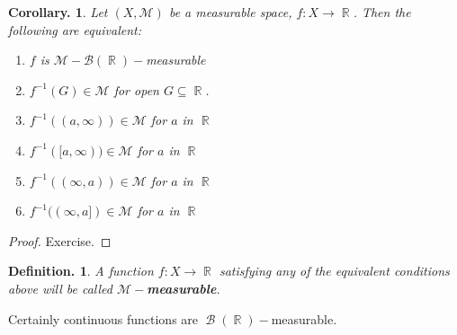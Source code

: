 \documentclass[11pt, a4paper]{memoir}
\DeclareMathOperator{\R}{{\mathbb{R}}}
\newcommand{\mbf}[1]{{\boldmath\bfseries #1}}
\theoremstyle{change}
\newtheorem{corollary}[theorem]{Corollary.}
\theoremstyle{plain}
\theoremstyle{nonumberplain}
\newtheorem{definition}{Definition.}
\newtheorem{proof}{Proof}
\DeclareMathOperator{\B}{{\mathcal{B}}}
\numberwithin{equation}{section}
\begin{document}
\begin{corollary}\label{cor:br-m}
    Let $(X,\mathcal{M})$ be a measurable space, $f:X\to\R$.
    Then the following are equivalent:
    \begin{enumerate}[nl,r]
        \item $f$ is $\mathcal{M}-\mathcal{B}(\R)-$measurable
        \item $f^{-1}(G)\in\mathcal{M}$ for open $G\subseteq\R$.
        \item $f^{-1}((a,\infty))\in\mathcal{M}$ for $a$ in $\R$
        \item $f^{-1}([a,\infty))\in\mathcal{M}$ for $a$ in $\R$
        \item $f^{-1}((\infty,a))\in\mathcal{M}$ for $a$ in $\R$
        \item $f^{-1}((\infty,a])\in\mathcal{M}$ for $a$ in $\R$ %
    \end{enumerate}
\end{corollary}
\begin{proof}
    Exercise.
\end{proof}
\begin{definition}
    A function $f:X\to\R$ satisfying any of the equivalent conditions above will be called \mbf{$\mathcal{M}-$measurable}.
\end{definition}
Certainly continuous functions are $\B(\R)-$measurable.
\end{document}
